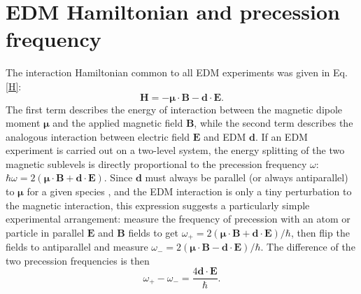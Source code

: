 \documentclass [10pt, twoside] {uwthesis}[2012/04/02]
\begin{document}
\section{EDM Hamiltonian and precession frequency}
The interaction Hamiltonian common to all EDM experiments was given in Eq. \eqref{H}:
\[\mathbf{H} = -\boldsymbol\mu\cdot\mathbf{B} - \mathbf{d}\cdot\mathbf{E}.\]
The first term describes the energy of interaction between the magnetic dipole moment $\boldsymbol\mu$ and the applied magnetic field $\mathbf{B}$, while the second term describes the analogous interaction between electric field $\mathbf{E}$ and EDM $\mathbf{d}$. If an EDM experiment is carried out on a two-level system, the energy splitting of the two magnetic sublevels is directly proportional to the precession frequency $\omega$:
$\hbar\omega = 2(\boldsymbol{\mu}\cdot\mathbf{B} + \mathbf{d}\cdot\mathbf{E}).$
Since $\mathbf{d}$ must always be parallel (or always antiparallel) to $\boldsymbol{\mu}$ for a given species \cite{Khriplovich_Lamoreaux}, and the EDM interaction is only a tiny perturbation to the magnetic interaction, this expression suggests a particularly simple experimental arrangement: measure the frequency of precession with an atom or particle in parallel $\mathbf{E}$ and $\mathbf{B}$ fields to get $\omega_+ = 2 (\boldsymbol{\mu}\cdot\mathbf{B} + \mathbf{d}\cdot\mathbf{E})/\hbar$, then flip the fields to antiparallel and measure $\omega_- = 2(\boldsymbol{\mu}\cdot\mathbf{B} - \mathbf{d}\cdot\mathbf{E})/\hbar$. The difference of the two precession frequencies is then \[\omega_+ - \omega_- = \dfrac{4\mathbf{d}\cdot\mathbf{E}}{\hbar}.\]
\end{document}
